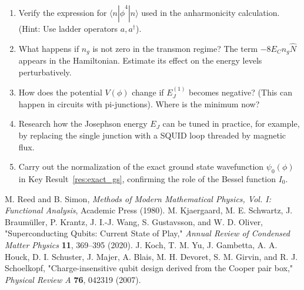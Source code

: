 \documentclass{book}
\begin{document}
\begin{enumerate}
    \item Verify the expression for \(\langle n | \hat{\phi}^4 | n \rangle\) used in the anharmonicity calculation. (Hint: Use ladder operators \(a, a^\dagger\)).
    \item What happens if \(n_g\) is not zero in the transmon regime? The term \(-8 E_C n_g \hat{N}\) appears in the Hamiltonian. Estimate its effect on the energy levels perturbatively.
    \item How does the potential \(V(\phi)\) change if \(E_J^{(1)}\) becomes negative? (This can happen in circuits with pi-junctions). Where is the minimum now?
    \item Research how the Josephson energy \(E_J\) can be tuned in practice, for example, by replacing the single junction with a SQUID loop threaded by magnetic flux.
    \item Carry out the normalization of the exact ground state wavefunction \(\psi_0(\phi)\) in Key Result~\ref{res:exact_gs}, confirming the role of the Bessel function \(I_0\).
\end{enumerate}

\begin{thebibliography}{9}
 M. Reed and B. Simon, \textit{Methods of Modern Mathematical Physics, Vol. I: Functional Analysis}, Academic Press (1980). %
 M. Kjaergaard, M. E. Schwartz, J. Braumüller, P. Krantz, J. I.-J. Wang, S. Gustavsson, and W. D. Oliver, "Superconducting Qubits: Current State of Play," \textit{Annual Review of Condensed Matter Physics} \textbf{11}, 369–395 (2020). %
 J. Koch, T. M. Yu, J. Gambetta, A. A. Houck, D. I. Schuster, J. Majer, A. Blais, M. H. Devoret, S. M. Girvin, and R. J. Schoelkopf, "Charge-insensitive qubit design derived from the Cooper pair box," \textit{Physical Review A} \textbf{76}, 042319 (2007). %
\end{thebibliography}
\end{document}
